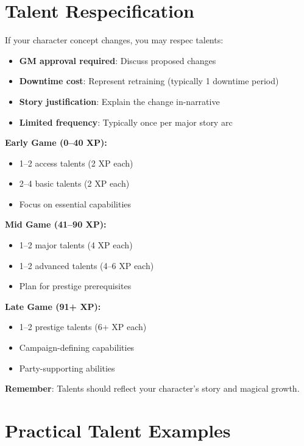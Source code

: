 \section{Talent Respecification}

If your character concept changes, you may respec talents:
\begin{itemize}
\item \textbf{GM approval required}: Discuss proposed changes
\item \textbf{Downtime cost}: Represent retraining (typically 1 downtime period)
\item \textbf{Story justification}: Explain the change in-narrative
\item \textbf{Limited frequency}: Typically once per major story arc
\end{itemize}

\begin{tcolorbox}[colback=purple!5!white,colframe=purple!75!black,title=Talent Selection Guide,fonttitle=\bfseries]
\textbf{Early Game (0--40 XP):}
\begin{itemize}
\item 1--2 access talents (2 XP each)
\item 2--4 basic talents (2 XP each)
\item Focus on essential capabilities
\end{itemize}

\textbf{Mid Game (41--90 XP):}
\begin{itemize}
\item 1--2 major talents (4 XP each)
\item 1--2 advanced talents (4--6 XP each)
\item Plan for prestige prerequisites
\end{itemize}

\textbf{Late Game (91+ XP):}
\begin{itemize}
\item 1--2 prestige talents (6+ XP each)
\item Campaign-defining capabilities
\item Party-supporting abilities
\end{itemize}

\textbf{Remember}: Talents should reflect your character's story and magical growth.
\end{tcolorbox}

\section{Practical Talent Examples}

